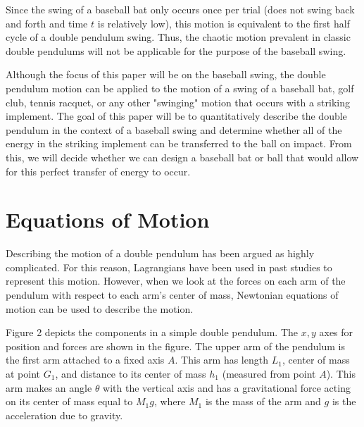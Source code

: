 \documentclass[%
 aip,
 amsmath,amssymb,
 reprint,%
 floatfix,%
]{revtex4-1}
\begin{document}
Since the swing of a baseball bat only occurs once per trial (does not swing back and forth and time $t$ is relatively low), this motion is equivalent to the first half cycle of a double pendulum swing. Thus, the chaotic motion prevalent in classic double pendulums will not be applicable for the purpose of the baseball swing.

Although the focus of this paper will be on the baseball swing, the double pendulum motion can be applied to the motion of a swing of a baseball bat, golf club, tennis racquet, or any other "swinging" motion that occurs with a striking implement. The goal of this paper will be to quantitatively describe the double pendulum in the context of a baseball swing and determine whether all of the energy in the striking implement can be transferred to the ball on impact. From this, we will decide whether we can design a baseball bat or ball that would allow for this perfect transfer of energy to occur.

\section{\label{sec:level2}Equations of Motion}

Describing the motion of a double pendulum has been argued as highly complicated\cite{Jorgensen1970}. For this reason, Lagrangians have been used in past studies to represent this motion. However, when we look at the forces on each arm of the pendulum with respect to each arm's center of mass, Newtonian equations of motion can be used to describe the motion.

Figure 2 depicts the components in a simple double pendulum. The $x,y$ axes for position and forces are shown in the figure. The upper arm of the pendulum is the first arm attached to a fixed axis $A$. This arm has length $L_1$, center of mass at point $G_1$, and distance to its center of mass $h_1$ (measured from point $A$). This arm makes an angle $\theta$ with the vertical axis and has a gravitational force acting on its center of mass equal to $M_1 g$, where $M_1$ is the mass of the arm and $g$ is the acceleration due to gravity.
\end{document}
